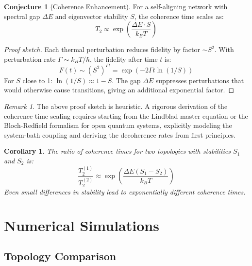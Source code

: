 \documentclass[11pt,a4paper]{article}
\theoremstyle{plain}
\newtheorem{corollary}[theorem]{Corollary}
\theoremstyle{definition}
\newtheorem{conjecture}[theorem]{Conjecture}
\theoremstyle{remark}
\newtheorem{remark}[theorem]{Remark}
\begin{document}
\begin{conjecture}[Coherence Enhancement]
For a self-aligning network with spectral gap $\Delta E$ and eigenvector stability $S$, the coherence time scales as:
\begin{equation}
T_2 \propto \exp\left(\frac{\Delta E \cdot S}{k_B T}\right)
\end{equation}
\end{conjecture}

\begin{proof}[Proof sketch]
Each thermal perturbation reduces fidelity by factor $\sim S^2$. With perturbation rate $\Gamma \sim k_B T / \hbar$, the fidelity after time $t$ is:
\begin{equation}
F(t) \sim (S^2)^{\Gamma t} = \exp(-2\Gamma t \ln(1/S))
\end{equation}
For $S$ close to 1: $\ln(1/S) \approx 1 - S$. The gap $\Delta E$ suppresses perturbations that would otherwise cause transitions, giving an additional exponential factor.
\end{proof}

\begin{remark}
The above proof sketch is heuristic. A rigorous derivation of the coherence time scaling requires starting from the Lindblad master equation or the Bloch-Redfield formalism for open quantum systems, explicitly modeling the system-bath coupling and deriving the decoherence rates from first principles.
\end{remark}

\begin{corollary}
The ratio of coherence times for two topologies with stabilities $S_1$ and $S_2$ is:
\begin{equation}
\frac{T_2^{(1)}}{T_2^{(2)}} \approx \exp\left(\frac{\Delta E (S_1 - S_2)}{k_B T}\right)
\end{equation}
Even small differences in stability lead to exponentially different coherence times.
\end{corollary}

\section{Numerical Simulations}

\subsection{Topology Comparison}
\end{document}
